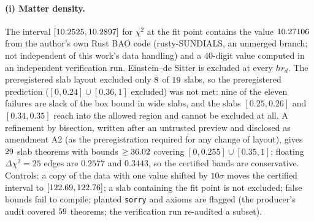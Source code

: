 \documentclass[11pt]{article}
\begin{document}
\paragraph{(i) Matter density.} The interval $[10.2525,10.2897]$ for $\chi^2$ at the fit point contains the value $10.27106$ from the author's own Rust BAO code
(rusty-SUNDIALS, an unmerged branch; not independent of this work's data handling) and a 40-digit value computed in an independent verification run.
Einstein--de Sitter is excluded at every $h r_d$. The preregistered slab layout excluded only $8$ of $19$ slabs, so the preregistered prediction
($[0,0.24]\cup[0.36,1]$ excluded) was not met: nine of the eleven failures are slack of the box bound in wide slabs, and the slabs $[0.25,0.26]$ and $[0.34,0.35]$ reach into the
allowed region and cannot be excluded at all. A refinement by bisection, written after an untrusted preview and disclosed as amendment A2 (as the preregistration required for any
change of layout), gives $29$ slab theorems with bounds $\ge36.02$ covering $[0,0.255]\cup[0.35,1]$; floating $\Delta\chi^2=25$ edges are $0.2577$ and $0.3443$, so the certified
bands are conservative. Controls: a copy of the data with one value shifted by $10\sigma$ moves the certified interval to $[122.69,122.76]$; a slab containing the fit point is not
excluded; false bounds fail to compile; planted \texttt{sorry} and axioms are flagged (the producer's audit covered $59$ theorems; the verification run re-audited a subset).
\end{document}
